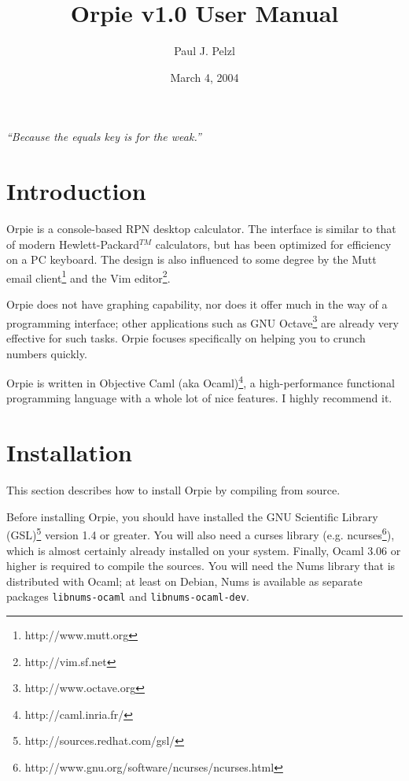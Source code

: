 \documentclass[11pt,notitlepage]{article}
\begin{document}
\title{Orpie v1.0 User Manual}
\author{Paul J. Pelzl}
\date{March 4, 2004}
\maketitle

\begin{center}
{\em ``Because the equals key is for the weak.''}
\end{center}


\section{Introduction}
Orpie is a console-based RPN desktop calculator.  The interface is similar to
that of modern Hewlett-Packard${}^{TM}$ calculators, but has been optimized for
efficiency on a PC keyboard.  The design is also influenced to some degree by 
the Mutt email client\footnote{http://www.mutt.org} and the Vim
editor\footnote{http://vim.sf.net}.

Orpie does not have graphing capability, nor does it offer much in the way of a
programming interface; other applications such as GNU
Octave\footnote{http://www.octave.org} are already very effective for such
tasks.  Orpie focuses specifically on helping you to crunch numbers quickly.

Orpie is written in Objective Caml (aka Ocaml)\footnote{http://caml.inria.fr/}, a
high-performance functional programming language with a whole lot of nice
features.  I highly recommend it.

\section{Installation}
This section describes how to install Orpie by compiling from source.

Before installing Orpie, you should have installed the GNU Scientific Library
(GSL)\footnote{http://sources.redhat.com/gsl/} version 1.4 or greater.  You will
also need a curses library (e.g.
ncurses\footnote{http://www.gnu.org/software/ncurses/ncurses.html}), which is
almost certainly already installed on your system.  Finally, Ocaml 3.06 or
higher is required to compile the sources.  You will need the Nums library that
is distributed with Ocaml; at least on Debian, Nums is available as separate
packages {\tt libnums-ocaml} and {\tt libnums-ocaml-dev}.
\end{document}
